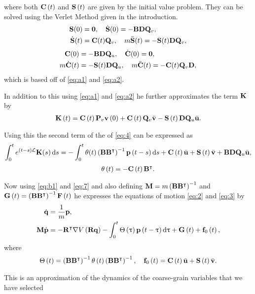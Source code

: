 where both $\mathbf{C}\left( t \right)$ and $\mathbf{S}\left( t \right)$ are given by the initial value problem. They can be solved using the Verlet Method given in the introduction.
\begin{align*}
\mathbf{S}(0)  &= \mathbf{0},\quad \dot{\mathbf{S}}(0)=-\mathbf{B}\mathbf{D}\mathbf{Q}_v, \\
\dot{\mathbf{S}}(t) & = \mathbf{C}(t)\mathbf{Q}_v,\quad m\ddot{\mathbf{S}}(t)=-\mathbf{S}(t)\mathbf{D}\mathbf{Q}_v,
\end{align*}
\begin{align*}
\mathbf{C}(0) &= -\mathbf{B}\mathbf{D}\mathbf{Q}_u,\quad \dot{\mathbf{C}}(0)=\mathbf{0},\\
m\dot{\mathbf{C}}(t) & = -\mathbf{S}(t)\mathbf{D}\mathbf{Q}_u,\quad m\ddot{\mathbf{C}}(t) =-\mathbf{C}(t)\mathbf{Q}_v\mathbf{D},
\end{align*}
which is based off of \eqref{eq:a1} and \eqref{eq:a2}. 

In addition to this using \eqref{eq:a1} and \eqref{eq:a2} he further approximates the term $\mathbf{K}$ by 
\begin{align}
\mathbf{K}\left( t \right) = \mathbf{C}\left( t \right)\mathbf{P}_v\mathbf{v}\left( 0 \right) + \mathbf{C}\left(t\right)\mathbf{Q}_v\bar{\mathbf{v}}-\mathbf{S}\left(t\right)\mathbf{D}\mathbf{Q}_u\bar{\mathbf{u}}.\\
\end{align}

Using this the second term of the of \eqref{eq:4} can be expressed as 
\begin{align}
\int_{0}^{t} e^{(t-s)\mathbf{\mathcal{L}}}\mathbf{K}(s) \mathop{}\!\mathrm{d} s = -\int_{0}^{t} \theta(t) \left(\mathbf{B} \mathbf{B}^{\intercal}\right)^{-1} \mathbf{p}\left(t-s\right) \mathop{}\!\mathrm{d} s +\mathbf{C}\left(t\right) \bar{\mathbf{u}} + \mathbf{S}\left(t\right)\bar{\mathbf{v}} + \mathbf{B}\mathbf{D}\mathbf{Q}_u\bar{\mathbf{u}},\label{eq:b1}
\end{align}
\begin{align*}
\theta\left(t\right) = -\mathbf{C}\left(t\right)\mathbf{B}^{\intercal}.
\end{align*}

Now using \eqref{eq:b1} and \eqref{eq:7} and also defining $\mathbf{M} = m\left(\mathbf{B}\mathbf{B}^{\intercal}\right)^{-1}$ and $\mathbf{G}\left(t\right) = \left(\mathbf{B}\mathbf{B}^{\intercal}\right)^{-1}\mathbf{F}\left(t\right) $ he expresses the equations of motion \eqref{eq:2} and \eqref{eq:3} by 
\begin{align}
\dot{\mathbf{q}} & = \frac{1}{m}\mathbf{p},\label{eq:q}\\
\mathbf{M}\dot{\mathbf{p}} & = -\mathbf{R}^{\intercal} \nabla V \left(\mathbf{R}\mathbf{q} \right) - \int_{0}^{t} \Theta\left(\uptau\right)\mathbf{p}\left(t-\uptau\right) \mathop{}\!\mathrm{d} \uptau +\mathbf{G}\left(t\right) + \mathbf{f}_0\left(t\right),\label{eq:p}
\end{align}
where
\begin{align}
\Theta\left( t\right) = \left(\mathbf{B}\mathbf{B}^{\intercal}\right)^{-1}\theta\left(t\right)\left(\mathbf{B}\mathbf{B}^{\intercal}\right)^{-1}, \quad \mathbf{f}_{0}\left(t\right)=\mathbf{C}\left(t\right)\bar{\mathbf{u}}+\mathbf{S}\left(t\right)\bar{\mathbf{v}}.
\end{align}

This is an approximation of the dynamics of the coarse-grain variables that we have selected